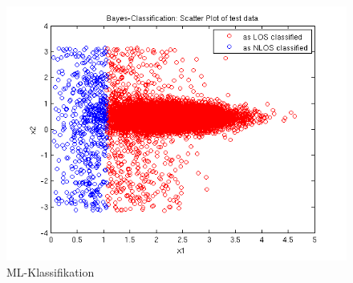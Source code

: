 \begin{figure}[ht!]
 \centering
 \includegraphics{./figures/5_1_1_bayes.png}
 \caption{ML-Klassifikation}
 \label{abb:bayes}
\end{figure}
